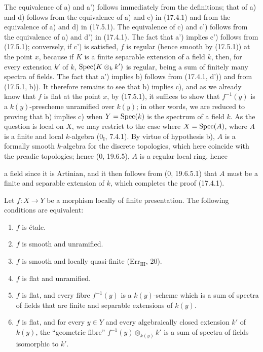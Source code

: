 The equivalence of a) and a') follows immediately from the definitions; that of a) and d) follows from the equivalence of a) and e) in (17.4.1) and from the equivalence of a) and d) in (17.5.1). The equivalence of c) and c') follows from the equivalence of a) and d') in (17.4.1). The fact that a') implies c') follows from (17.5.1); conversely, if c') is satisfied, $f$ is regular (hence smooth by (17.5.1)) at the point $x$, because if $K$ is a finite separable extension of a field $k$, then, for every extension $k'$ of $k$, $\operatorname{Spec}(K\otimes_k k')$ is regular, being a sum of finitely many spectra of fields. The fact that a') implies b) follows from (17.4.1, d')) and from (17.5.1, b)). It therefore remains to see that b) implies c), and as we already know that $f$ is flat at the point $x$, by (17.5.1), it suffices to show that $f^{-1}(y)$ is a $k(y)$-prescheme unramified over $k(y)$; in other words, we are reduced to proving that b) implies c) when $Y=\operatorname{Spec}(k)$ is the spectrum of a field $k$. As the question is local on $X$, we may restrict to the case where $X=\operatorname{Spec}(A)$, where $A$ is a finite and local $k$-algebra ($0_{\mathrm I}$, 7.4.1). By virtue of hypothesis b), $A$ is a formally smooth $k$-algebra for the discrete topologies, which here coincide with the preadic topologies; hence (0, 19.6.5), $A$ is a regular local ring, hence

a field since it is Artinian, and it then follows from (0, 19.6.5.1) that $A$ must be a finite and separable extension of $k$, which completes the proof (17.4.1).

\begin{corollary}[17.6.2]
\label{IV.17.6.2}
Let $f:X\to Y$ be a morphism locally of finite presentation. The following conditions are equivalent:
\begin{enumerate}
  \item[a)] $f$ is étale.
  \item[a')] $f$ is smooth and unramified.
  \item[b)] $f$ is smooth and locally quasi-finite (Err$_{\mathrm{III}}$, 20).
  \item[c)] $f$ is flat and unramified.
  \item[c')] $f$ is flat, and every fibre $f^{-1}(y)$ is a $k(y)$-scheme which is a sum of spectra of fields that are finite and separable extensions of $k(y)$.
  \item[c'')] $f$ is flat, and for every $y\in Y$ and every algebraically closed extension $k'$ of $k(y)$, the ``geometric fibre'' $f^{-1}(y)\otimes_{k(y)}k'$ is a sum of spectra of fields isomorphic to $k'$.
\end{enumerate}
\end{corollary}

